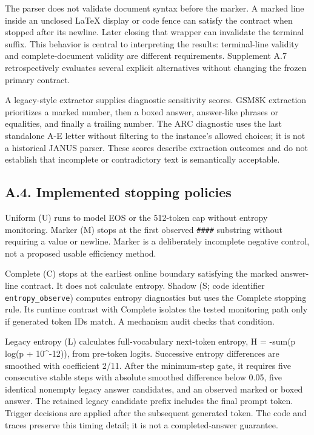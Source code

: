 \documentclass[
  12pt,
  a4paper,
]{article}
\begin{document}
The parser does not validate document syntax before the marker. A marked
line inside an unclosed LaTeX display or code fence can satisfy the
contract when stopped after its newline. Later closing that wrapper can
invalidate the terminal suffix. This behavior is central to interpreting
the results: terminal-line validity and complete-document validity are
different requirements. Supplement A.7 retrospectively evaluates several
explicit alternatives without changing the frozen primary contract.

A legacy-style extractor supplies diagnostic sensitivity scores. GSM8K
extraction prioritizes a marked number, then a boxed answer, answer-like
phrases or equalities, and finally a trailing number. The ARC diagnostic
uses the last standalone A-E letter without filtering to the instance's
allowed choices; it is not a historical JANUS parser. These scores
describe extraction outcomes and do not establish that incomplete or
contradictory text is semantically acceptable.

\subsection{A.4. Implemented stopping
policies}\label{a.4.-implemented-stopping-policies}

Uniform (U) runs to model EOS or the 512-token cap without entropy
monitoring. Marker (M) stops at the first observed \texttt{\#\#\#\#}
substring without requiring a value or newline. Marker is a deliberately
incomplete negative control, not a proposed usable efficiency method.

Complete (C) stops at the earliest online boundary satisfying the marked
answer-line contract. It does not calculate entropy. Shadow (S; code
identifier \texttt{entropy\_observe}) computes entropy diagnostics but
uses the Complete stopping rule. Its runtime contrast with Complete
isolates the tested monitoring path only if generated token IDs match. A
mechanism audit checks that condition.

Legacy entropy (L) calculates full-vocabulary next-token entropy, H =
-sum(p log(p + 10\^{}-12)), from pre-token logits. Successive entropy
differences are smoothed with coefficient 2/11. After the minimum-step
gate, it requires five consecutive stable steps with absolute smoothed
difference below 0.05, five identical nonempty legacy answer candidates,
and an observed marked or boxed answer. The retained legacy candidate
prefix includes the final prompt token. Trigger decisions are applied
after the subsequent generated token. The code and traces preserve this
timing detail; it is not a completed-answer guarantee.
\end{document}
